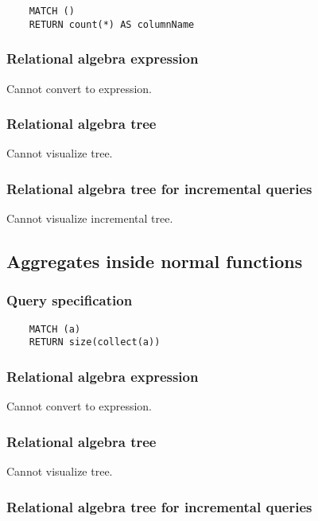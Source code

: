 	\begin{lstlisting}
	MATCH ()
	RETURN count(*) AS columnName
	\end{lstlisting}


	\subsubsection*{Relational algebra expression}

	Cannot convert to expression.

	\subsubsection*{Relational algebra tree}

	Cannot visualize tree.

	\subsubsection*{Relational algebra tree for incremental queries}

	Cannot visualize incremental tree.
	\subsection{Aggregates inside normal functions}

	\subsubsection*{Query specification}

	\begin{lstlisting}
	MATCH (a)
	RETURN size(collect(a))
	\end{lstlisting}


	\subsubsection*{Relational algebra expression}

	Cannot convert to expression.

	\subsubsection*{Relational algebra tree}

	Cannot visualize tree.

	\subsubsection*{Relational algebra tree for incremental queries}

